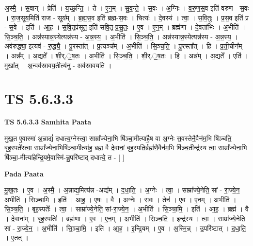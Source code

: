 \documentclass[17pt]{extarticle}
\begin{document}
अ॒स्मै॒ । स॒वान् । प्रेति॑ । य॒च्छ॒न्ति॒ । ते । ए॒न॒म् । सु॒व॒न्ते॒ । स॒वः । अ॒ग्निः । व॒रु॒ण॒स॒व इति॑ वरुण - स॒वः । रा॒ज॒सूय॒मिति॑ राज - सूय᳚म् । ब्र॒ह्म॒स॒व इति॑ ब्रह्म-स॒वः । चित्यः॑ । दे॒वस्य॑ । त्वा॒ । स॒वि॒तुः । प्र॒स॒व इति॑ प्र - स॒वे । इति॑ । आ॒ह॒ । स॒वि॒तृप्र॑सूत॒ इति॑ सवि॒तृ-प्र॒सू॒तः॒ । ए॒व । ए॒न॒म् । ब्रह्म॑णा । दे॒वता॑भिः । अ॒भीति॑ । सि॒ञ्च॒ति॒ । अन्न॑स्यान्न॒स्येत्यन्न॑स्य - अ॒न्न॒स्य॒ । अ॒भीति॑ । सि॒ञ्च॒ति॒ । अन्न॑स्यान्न॒स्येत्यन्न॑स्य - अ॒न्न॒स्य॒ । अव॑रुद्ध्या॒ इत्यव॑ - रु॒द्ध्यै॒ । पु॒रस्ता᳚त् । प्र॒त्यञ्च᳚म् । अ॒भीति॑ । सि॒ञ्च॒ति॒ । पु॒रस्ता᳚त् । हि । प्र॒ती॒चीन᳚म् । अन्न᳚म् । अ॒द्यते᳚ । शी॒र्.॒ष॒तः । अ॒भीति॑ । सि॒ञ्च॒ति॒ । शी॒र्.॒ष॒तः । हि । अन्न᳚म् । अ॒द्यते᳚ । एति॑ । मुखा᳚त् । अ॒न्वव॑स्रावय॒तीत्य॑नु - अव॑स्रावयति ।  \newline





\section{ TS 5.6.3.3 }

\textbf{TS 5.6.3.3 } \newline
\textbf{Samhita Paata} \newline

मुख॒त ए॒वास्मा॑ अ॒न्नाद्यं॑ दधात्य॒ग्नेस्त्वा॒ साम्रा᳚ज्येना॒भि षि॑ञ्चा॒मीत्या॑है॒ष वा अ॒ग्नेः स॒वस्तेनै॒वैन॑म॒भि षि॑ञ्चति॒ बृह॒स्पते᳚स्त्वा॒ साम्रा᳚ज्येना॒भिषि॑ञ्चा॒मीत्या॑ह॒ ब्रह्म॒ वै दे॒वानां॒ बृह॒स्पति॒र्ब्रह्म॑णै॒वैन॑म॒भि षि॑ञ्च॒तीन्द्र॑स्य त्वा॒ साम्रा᳚ज्येना॒भि षि॑ञ्चा॒-मीत्या॑हेन्द्रि॒यमे॒वास्मि॑-न्नु॒परि॑ष्टाद् दधात्ये॒ त - [  ] \newline

\textbf{Pada Paata} \newline

मु॒ख॒तः । ए॒व । अ॒स्मै॒ । अ॒न्नाद्य॒मित्य॑न्न -अद्य᳚म् । द॒धा॒ति॒ । अ॒ग्नेः । त्वा॒ । साम्रा᳚ज्ये॒नेति॒ सां - रा॒ज्ये॒न॒ । अ॒भीति॑ । सि॒ञ्चा॒मि॒ । इति॑ । आ॒ह॒ । ए॒षः । वै । अ॒ग्नेः । स॒वः । तेन॑ । ए॒व । ए॒न॒म् । अ॒भीति॑ । सि॒ञ्च॒ति॒ । बृह॒स्पतेः᳚ । त्वा॒ । साम्रा᳚ज्ये॒नेति॒ सां-रा॒ज्ये॒न॒ । अ॒भीति॑ । सि॒ञ्चा॒मि॒ । इति॑ । आ॒ह॒ । ब्रह्म॑ । वै । दे॒वाना᳚म् । बृह॒स्पतिः॑ । ब्रह्म॑णा । ए॒व । ए॒न॒म् । अ॒भीति॑ । सि॒ञ्च॒ति॒ । इन्द्र॑स्य । त्वा॒ । साम्रा᳚ज्ये॒नेति॒ सां - रा॒ज्ये॒न॒ । अ॒भीति॑ । सि॒ञ्चा॒मि॒ । इति॑ । आ॒ह॒ । इ॒न्द्रि॒यम् । ए॒व । अ॒स्मि॒न्न् । उ॒परि॑ष्टात् । द॒धा॒ति॒ । ए॒तत् ।  \newline
\end{document}
